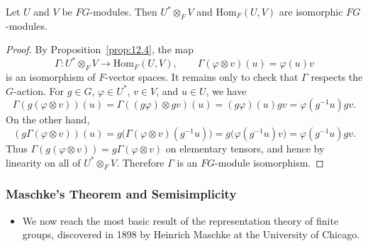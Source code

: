 \documentclass[../Odyssey_Project.tex]{subfiles}
\begin{document}
\begin{proposition}
\label{prop:12.7}
Let $U$ and $V$ be $FG$-modules. Then $U^* \otimes_F V$ and $\mathrm{Hom}_F(U, V)$ are isomorphic $FG$-modules.
\end{proposition}
\begin{proof}
    By Proposition~\ref{prop:12.4}, the map
    \[
        \Gamma \colon U^* \otimes_F V \to \mathrm{Hom}_F(U,V),
        \qquad
        \Gamma(\varphi \otimes v)(u) = \varphi(u)v
    \]
    is an isomorphism of $F$-vector spaces. It remains only to check that $\Gamma$ respects the $G$-action. For $g \in G$, $\varphi \in U^*$, $v \in V$, and $u \in U$, we have
    \[
        \Gamma(g(\varphi \otimes v))(u)
        = \Gamma((g\varphi) \otimes gv)(u)
        = (g\varphi)(u)gv
        = \varphi(g^{-1}u)gv.
    \]
    On the other hand,
    \[
        (g\Gamma(\varphi \otimes v))(u)
        = g\bigl(\Gamma(\varphi \otimes v)(g^{-1}u)\bigr)
        = g\bigl(\varphi(g^{-1}u)v\bigr)
        = \varphi(g^{-1}u)gv.
    \]
    Thus $\Gamma(g(\varphi \otimes v)) = g\Gamma(\varphi \otimes v)$ on elementary tensors, and hence by linearity on all of $U^* \otimes_F V$. Therefore $\Gamma$ is an $FG$-module isomorphism.
\end{proof}

\subsubsection*{Maschke's Theorem and Semisimplicity}
\begin{itemize}
    \item We now reach the most basic result of the representation theory of finite groups, discovered in 1898 by Heinrich Maschke at the University of Chicago.
\end{itemize}
\end{document}
